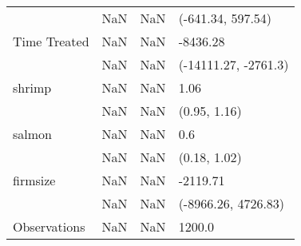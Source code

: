 \begin{tabular}{llll}
             &                     NaN &                    NaN &     (-641.34, 597.54) \\
Time Treated &                     NaN &                    NaN &              -8436.28 \\
             &                     NaN &                    NaN &  (-14111.27, -2761.3) \\
shrimp       &                     NaN &                    NaN &                  1.06 \\
             &                     NaN &                    NaN &          (0.95, 1.16) \\
salmon       &                     NaN &                    NaN &                   0.6 \\
             &                     NaN &                    NaN &          (0.18, 1.02) \\
firmsize     &                     NaN &                    NaN &              -2119.71 \\
             &                     NaN &                    NaN &   (-8966.26, 4726.83) \\
Observations &                     NaN &                    NaN &                1200.0 \\
\bottomrule
\end{tabular}
